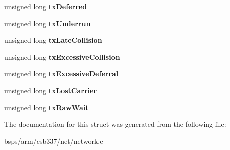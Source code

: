 \begin{DoxyCompactItemize}
unsigned long {\bfseries tx\+Deferred}
\item 
\mbox{\label{structat91rm9200__emac__softc__t_a00992bd92abd8187b157675f6250b8fb}} 
unsigned long {\bfseries tx\+Underrun}
\item 
\mbox{\label{structat91rm9200__emac__softc__t_a379fee43d46a5c8d1bfa23018ac3028a}} 
unsigned long {\bfseries tx\+Late\+Collision}
\item 
\mbox{\label{structat91rm9200__emac__softc__t_ac9f6df113b4f0a33e86a9229901b55cd}} 
unsigned long {\bfseries tx\+Excessive\+Collision}
\item 
\mbox{\label{structat91rm9200__emac__softc__t_a0cd2bd7f3d4f6dbeea92fdc6bf4146aa}} 
unsigned long {\bfseries tx\+Excessive\+Deferral}
\item 
\mbox{\label{structat91rm9200__emac__softc__t_a26a2f952c5e02a5010b749c202799b6e}} 
unsigned long {\bfseries tx\+Lost\+Carrier}
\item 
\mbox{\label{structat91rm9200__emac__softc__t_adde3b071ea39ac2d7a6f03c7613e490c}} 
unsigned long {\bfseries tx\+Raw\+Wait}
\end{DoxyCompactItemize}


The documentation for this struct was generated from the following file\+:\begin{DoxyCompactItemize}
\item 
bsps/arm/csb337/net/network.\+c\end{DoxyCompactItemize}
